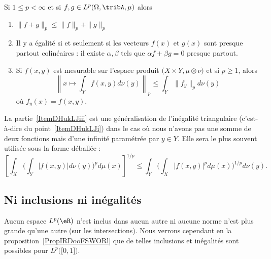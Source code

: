 \begin{proposition}     \label{PropInegMinkKUpRHg}
    Si \( 1\leq p<\infty\) et si \( f,g\in L^p(\Omega,\tribA,\mu)\) alors
    \begin{enumerate}
        \item   \label{ItemDHukLJi}
            \( \| f+g \|_p\leq \| f \|_p+\| g \|_p\)
        \item
            Il y a égalité si et seulement si les vecteurs \( f(x)\) et \( g(x)\) sont presque partout colinéaires : il existe \( \alpha,\beta\) tels que \( \alpha f+\beta g=0\) presque partout.

        \item   \label{ItemDHukLJiii}

            Si \( f(x,y)\) est mesurable sur l'espace produit \( \big( X\times Y,\mu\otimes\nu \big)\) et si \( p\geq 1\), alors
            \begin{equation}
                \left\|   x\mapsto\int_Y f(x,y)d\nu(y)   \right\|_p\leq \int_Y  \| f_y \|_pd\nu(y)
            \end{equation}
            où \( f_y(x)=f(x,y)\).

    \end{enumerate}
\end{proposition}

La partie~\ref{ItemDHukLJiii} est une généralisation de l'inégalité triangulaire (c'est-à-dire du point~\ref{ItemDHukLJi}) dans le cas où nous n'avons pas une somme de deux fonctions mais d'une infinité paramétrée par \( y\in Y\). Elle sera le plus souvent utilisée sous la forme déballée :
\begin{equation}    \label{EqZSiTZrH}
    \left[ \int_X\Big( \int_Y| f(x,y) |d\nu(y) \Big)^pd\mu(x) \right]^{1/p}\leq \int_Y\Big( \int_X| f(x,y) |^pd\mu(x) \Big)^{1/p}d\nu(y).
\end{equation}

\subsection{Ni inclusions ni inégalités}

Aucun espace \( L^p(\eR)\) n'est inclus dans aucun autre ni aucune norme n'est plus grande qu'une autre (sur les intersections). Nous verrons cependant en la proposition~\ref{PropIRDooFSWORl} que de telles inclusions et inégalités sont possibles pour \( L^p\big( \mathopen[ 0 , 1 \mathclose] \big)\).

